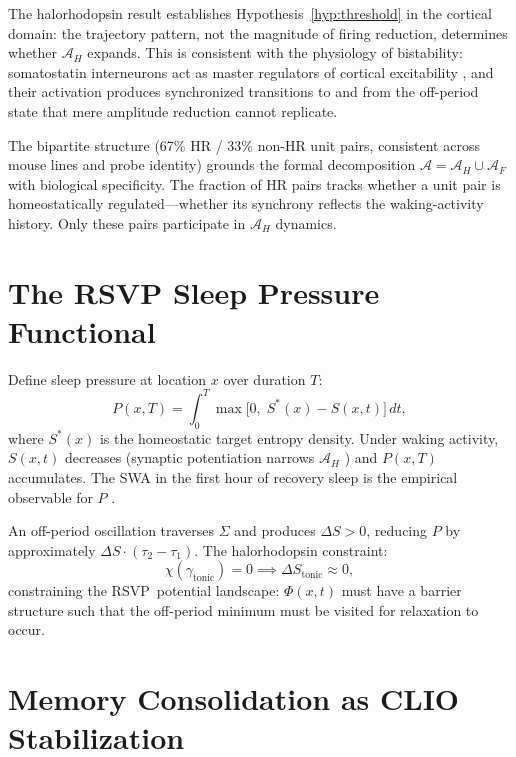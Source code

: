 \documentclass[12pt, a4paper, twoside]{book}
\theoremstyle{definition}
\theoremstyle{remark}
\newcommand{\Adm}{\mathcal{A}}
\newcommand{\slp}{P}
\newcommand{\RSVP}{\textsf{RSVP}}
\begin{document}
The halorhodopsin result establishes Hypothesis~\ref{hyp:threshold} in the cortical domain: the trajectory pattern, not the magnitude of firing reduction, determines whether $\Adm_H$ expands. This is consistent with the physiology of bistability: somatostatin interneurons act as master regulators of cortical excitability \citep{funk2017}, and their activation produces synchronized transitions to and from the off-period state that mere amplitude reduction cannot replicate.

The bipartite structure (67\% HR / 33\% non-HR unit pairs, consistent across mouse lines and probe identity) grounds the formal decomposition $\Adm = \Adm_H \cup \Adm_F$ with biological specificity. The fraction of HR pairs tracks whether a unit pair is homeostatically regulated---whether its synchrony reflects the waking-activity history. Only these pairs participate in $\Adm_H$ dynamics.

\section{The RSVP Sleep Pressure Functional}

Define sleep pressure at location $x$ over duration $T$:
\begin{equation}
  \slp(x,T) = \int_0^T \max\!\bigl[0,\; S^*(x) - S(x,t)\bigr]\,dt,
\end{equation}
where $S^*(x)$ is the homeostatic target entropy density. Under waking activity, $S(x,t)$ decreases (synaptic potentiation narrows $\Adm_H$ \citep{tononi2014}) and $\slp(x,T)$ accumulates. The SWA in the first hour of recovery sleep is the empirical observable for $\slp$ \citep{vyazovskiy2009, driessen2026}.

An off-period oscillation traverses $\Sigma$ and produces $\Delta S > 0$, reducing $\slp$ by approximately $\Delta S \cdot (\tau_2 - \tau_1)$. The halorhodopsin constraint:
\begin{equation}
  \chi(\gamma_{\mathrm{tonic}}) = 0 \implies \Delta S_{\mathrm{tonic}} \approx 0,
\end{equation}
constraining the \RSVP\ potential landscape: $\Phi(x,t)$ must have a barrier structure such that the off-period minimum must be visited for relaxation to occur.

\section{Memory Consolidation as CLIO Stabilization}
\end{document}
